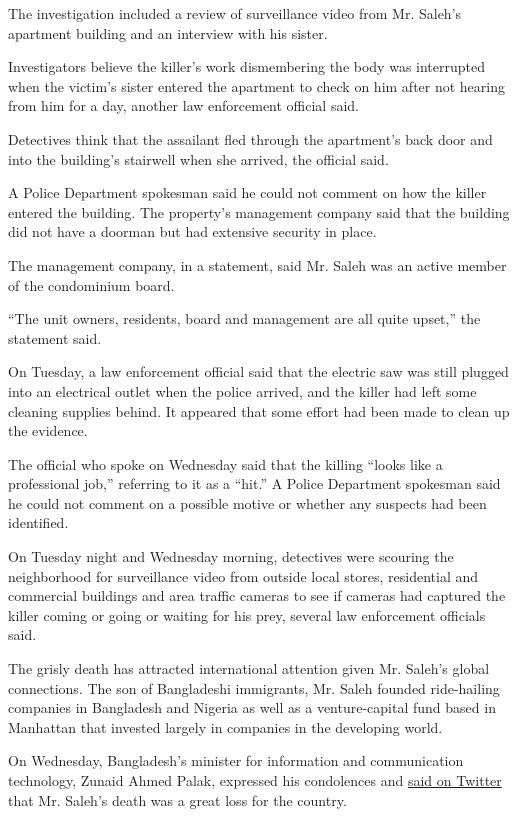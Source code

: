 The investigation included a review of surveillance video from Mr.
Saleh's apartment building and an interview with his sister.

Investigators believe the killer's work dismembering the body was
interrupted when the victim's sister entered the apartment to check on
him after not hearing from him for a day, another law enforcement
official said.

Detectives think that the assailant fled through the apartment's back
door and into the building's stairwell when she arrived, the official
said.

A Police Department spokesman said he could not comment on how the
killer entered the building. The property's management company said that
the building did not have a doorman but had extensive security in place.

The management company, in a statement, said Mr. Saleh was an active
member of the condominium board.

``The unit owners, residents, board and management are all quite
upset,'' the statement said.

On Tuesday, a law enforcement official said that the electric saw was
still plugged into an electrical outlet when the police arrived, and the
killer had left some cleaning supplies behind. It appeared that some
effort had been made to clean up the evidence.

The official who spoke on Wednesday said that the killing ``looks like a
professional job,'' referring to it as a ``hit.'' A Police Department
spokesman said he could not comment on a possible motive or whether any
suspects had been identified.

On Tuesday night and Wednesday morning, detectives were scouring the
neighborhood for surveillance video from outside local stores,
residential and commercial buildings and area traffic cameras to see if
cameras had captured the killer coming or going or waiting for his prey,
several law enforcement officials said.

The grisly death has attracted international attention given Mr. Saleh's
global connections. The son of Bangladeshi immigrants, Mr. Saleh founded
ride-hailing companies in Bangladesh and Nigeria as well as a
venture-capital fund based in Manhattan that invested largely in
companies in the developing world.

On Wednesday, Bangladesh's minister for information and communication
technology, Zunaid Ahmed Palak, expressed his condolences and
\href{https://twitter.com/zapalak/status/1283340969111203842}{said on
Twitter} that Mr. Saleh's death was a great loss for the country.

